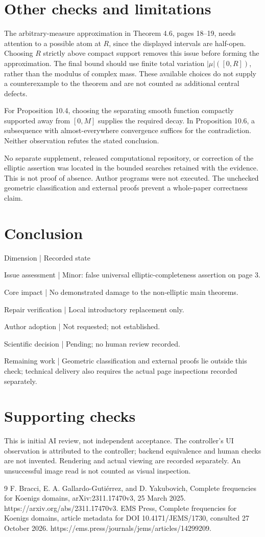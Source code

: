 \documentclass[10pt]{article}
\begin{document}
\section*{Other checks and limitations}
The arbitrary-measure approximation in Theorem 4.6, pages 18–19, needs attention to a possible atom at \(R\), since the displayed intervals are half-open. Choosing \(R\) strictly above compact support removes this issue before forming the approximation. The final bound should use finite total variation \(|\mu|([0,R])\), rather than the modulus of complex mass. These available choices do not supply a counterexample to the theorem and are not counted as additional central defects.\par
For Proposition 10.4, choosing the separating smooth function compactly supported away from \([0,M]\) supplies the required decay. In Proposition 10.6, a subsequence with almost-everywhere convergence suffices for the contradiction. Neither observation refutes the stated conclusion.\par
No separate supplement, released computational repository, or correction of the elliptic assertion was located in the bounded searches retained with the evidence. This is not proof of absence. Author programs were not executed. The unchecked geometric classification and external proofs prevent a whole-paper correctness claim.\par
\section*{Conclusion}
Dimension | Recorded state\par
Issue assessment | Minor: false universal elliptic-completeness assertion on page 3.\par
Core impact | No demonstrated damage to the non-elliptic main theorems.\par
Repair verification | Local introductory replacement only.\par
Author adoption | Not requested; not established.\par
Scientific decision | Pending; no human review recorded.\par
Remaining work | Geometric classification and external proofs lie outside this check; technical delivery also requires the actual page inspections recorded separately.\par
\section*{Supporting checks}
This is initial AI review, not independent acceptance. The controller’s UI observation is attributed to the controller; backend equivalence and human checks are not invented. Rendering and actual viewing are recorded separately. An unsuccessful image read is not counted as visual inspection.\par
9 F. Bracci, E. A. Gallardo-Gutiérrez, and D. Yakubovich, Complete frequencies for Koenigs domains, arXiv:2311.17470v3, 25 March 2025. https://arxiv.org/abs/2311.17470v3. EMS Press, Complete frequencies for Koenigs domains, article metadata for DOI 10.4171/JEMS/1730, consulted 27 October 2026. https://ems.press/journals/jems/articles/14299209.\par
\end{document}
